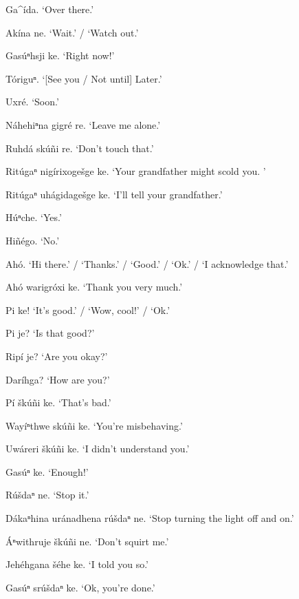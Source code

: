 \documentclass[output=paper]{LSP/langsci}
\begin{document}
\begin{list}{}{} \itemsep1pt \parskip0pt 
\item{Ga\^{ }ída. `Over there.'}
\item{Akína ne.	`Wait.' / `Watch out.'}
\item{Gasúⁿhsji ke. `Right now!'  }
\item{Tóriguⁿ.	`[See you / Not until] Later.'}
\item{Uxré. `Soon.'}
\item{Náhehiⁿna gigré re. `Leave me alone.'}
\item{Ruhdá skúñi re. `Don't touch that.'}
\item{Ritúgaⁿ nigírixogešge ke. `Your grandfather might scold you. '}
\item{Ritúgaⁿ uhágidagešge ke. `I'll tell your grandfather.'}
\item{}
\item{Húⁿche.	`Yes.'}
\item{Hiñégo. `No.'}
\item{Ahó.	`Hi there.' / `Thanks.' / `Good.' / `Ok.' / `I acknowledge that.'}
\item{Ahó warigróxi ke. `Thank you very much.'}
\item{Pi ke! `It's good.' / `Wow, cool!' / `Ok.'}
\item{Pi je? `Is that good?'}
\item{Ripí je? `Are you okay?'}
\item{Daríhga? `How are you?'}
\item{Pí škúñi ke. `That's bad.'}
\item{Wayíⁿthwe skúñi ke. `You're misbehaving.'}
\item{Uwáreri škúñi ke. `I didn't understand you.'}
\item{Gasúⁿ ke. `Enough!'}
\item{Rúšdaⁿ ne. `Stop it.'}
\item{Dákaⁿhina uránadhena rúšdaⁿ ne. `Stop turning the light off and on.'}
\item{\'Aⁿwithruje škúñi ne. `Don't squirt me.'}
\item{}
\item{Jehéhgana šéhe ke. `I told you so.'}
\item{Gasúⁿ srúšdaⁿ ke. `Ok, you're done.'}
\end{list} 
\end{document}
